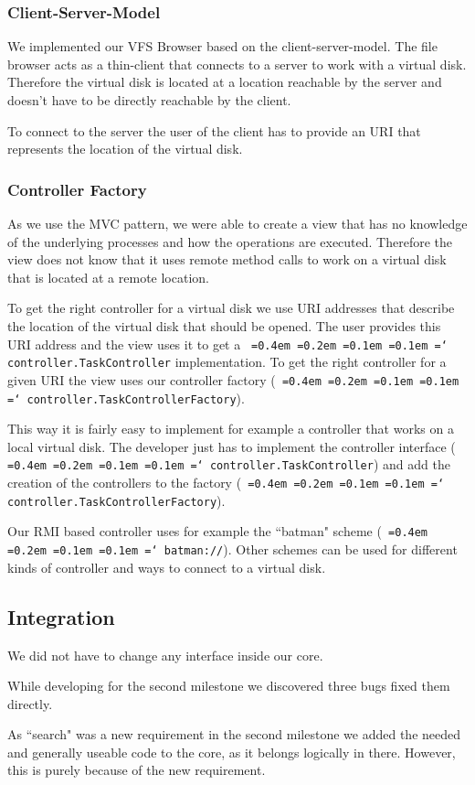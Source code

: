 \documentclass[a4paper,12pt]{article}
\newcommand*\justify{%
  \fontdimen2\font=0.4em%
  \fontdimen3\font=0.2em%
  \fontdimen4\font=0.1em%
  \fontdimen7\font=0.1em%
  \hyphenchar\font=`\-%
}
\newcommand{\mono}[1]{\texttt{\justify #1}}
\begin{document}
\subsubsection{Client-Server-Model}
We implemented our VFS Browser based on the client-server-model. The file browser acts as a thin-client that connects to a server to work with a virtual disk. Therefore the virtual disk is located at a location reachable by the server and doesn't have to be directly reachable by the client.

To connect to the server the user of the client has to provide an URI that represents the location of the virtual disk.

\subsubsection{Controller Factory}
As we use the MVC pattern, we were able to create a view that has no knowledge of the underlying processes and how the operations are executed. Therefore the view does not know that it uses remote method calls to work on a virtual disk that is located at a remote location.

To get the right controller for a virtual disk we use URI addresses that describe the location of the virtual disk that should be opened. The user provides this URI address and the view uses it to get a \mono{controller.TaskController} implementation. To get the right controller for a given URI the view uses our controller factory (\mono{controller.TaskControllerFactory}).

This way it is fairly easy to implement for example a controller that works on a local virtual disk. The developer just has to implement the controller interface (\mono{controller.TaskController}) and add the creation of the controllers to the factory (\mono{controller.TaskControllerFactory}).

Our RMI based controller uses for example the ``batman" scheme (\mono{batman://}). Other schemes can be used for different kinds of controller and ways to connect to a virtual disk.

\subsection{Integration}
We did not have to change any interface inside our core.

While developing for the second milestone we discovered three bugs fixed them directly.

As ``search" was a new requirement in the second milestone we added the needed and generally useable code to the core, as it belongs logically in there. However, this is purely because of the new requirement.
\end{document}
